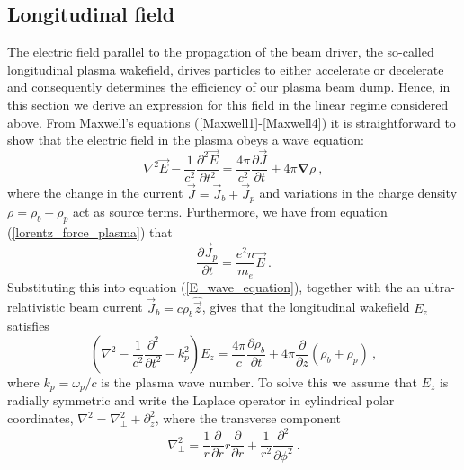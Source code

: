 \subsection{Longitudinal field} 
The electric field parallel to the propagation of the beam driver, the so-called longitudinal plasma wakefield, drives particles to either accelerate or decelerate and consequently determines the efficiency of our plasma beam dump. Hence, in this section we derive an expression for this field in the linear regime considered above. 
From Maxwell's equations (\ref{Maxwell1}-\ref{Maxwell4}) it is straightforward to show that the electric field in the plasma obeys a wave equation:
\begin{equation}
\nabla^2\vec{E}-\frac{1}{c^2}\frac{\partial^2 \vec{E}}{\partial t^2}=\frac{4\pi}{c^2}\frac{\partial \vec{J}}{\partial t}+4\pi\boldsymbol{\nabla}\rho~,
\label{E_wave_equation}
\end{equation}
where the change in the current $\vec{J}=\vec{J}_b+\vec{J}_p$ and variations in the charge density $\rho=\rho_b+\rho_p$ act as source terms. Furthermore, we have from equation (\ref{lorentz_force_plasma}) that 
\begin{equation}
\frac{\partial \vec{J}_p}{\partial t}=\frac{e^2 n}{m_e}\vec{E}~.
\end{equation}
Substituting this into equation (\ref{E_wave_equation}), together with the an ultra-relativistic beam current $\vec{J}_b=c\rho_b\hat{\vec{z}}$, gives that the longitudinal wakefield $E_z$ satisfies
\begin{equation}
\left(\nabla^2-\frac{1}{c^2}\frac{\partial^2}{\partial t^2}-k_p^2\right)E_z=\frac{4\pi}{c}\frac{\partial \rho_b}{\partial t}+4\pi\frac{\partial}{\partial z}\left(\rho_b+\rho_p\right)~,
\label{Ez_wave_equation}
\end{equation}
where $k_p=\omega_p/c$ is the plasma wave number. To solve this we assume that $E_z$ is radially symmetric and write the Laplace operator in cylindrical polar coordinates, $\nabla^2=\nabla^2_{\perp}+\partial^2_z$, where the transverse component
\begin{equation}
\nabla_{\perp}^2=\frac{1}{r}\frac{\partial }{\partial r}r\frac{\partial }{\partial r} +\frac{1}{r^2}\frac{\partial^2 }{\partial \phi^2} ~.
\end{equation}
